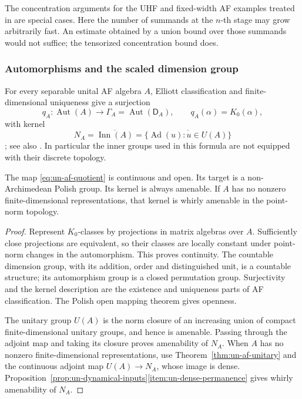 The concentration arguments for the UHF and fixed-width AF examples
treated in \cite[Proposition~5.1]{EFHKKL2016} are special cases.
Here the number of summands at the \(n\)-th stage may grow arbitrarily
fast. An estimate obtained by a union bound over those summands
would not suffice; the tensorized concentration bound does.


\subsubsection{Automorphisms and the scaled dimension group}
For every separable unital AF algebra \(A\), Elliott classification and
finite-dimensional uniqueness give a surjection
\begin{equation}\label{eq:un-af-quotient}
 q_A:\operatorname{Aut}(A)\longrightarrow\Gamma_A=\operatorname{Aut}(\mathsf D_A),\qquad
 q_A(\alpha)=K_0(\alpha),
\end{equation}
with kernel
\[
 N_A=\overline{\operatorname{Inn}(A)}
 =\overline{\{\operatorname{Ad}(u):u\in U(A)\}}
\]
\cite{Elliott1976}; see also \cite[Exercise~7.7.5]{Blackadar1998}. In particular the inner groups used in
this formula are not equipped with their discrete topology.

\begin{proposition}\label{prop:un-af-quotient}
The map \eqref{eq:un-af-quotient} is continuous and open.
Its target is a non-Archimedean Polish group. Its kernel is always
amenable. If \(A\) has no nonzero finite-dimensional representations,
that kernel is whirly amenable in the point-norm topology.
\end{proposition}
\begin{proof}
Represent \(K_0\)-classes by projections in matrix algebras over \(A\).
Sufficiently close projections are equivalent, so their classes are
locally constant under point-norm changes in the automorphism.
This proves continuity.
The countable dimension group, with its addition, order and distinguished unit,
is a countable structure; its automorphism group is a closed
permutation group. Surjectivity and the kernel description are
the existence and uniqueness parts of AF classification. The
Polish open mapping theorem gives openness.

The unitary group \(U(A)\) is the norm closure of an
increasing union of compact finite-dimensional unitary groups,
and hence is amenable. Passing through the adjoint map and taking its
closure proves amenability of \(N_A\). When \(A\) has no nonzero
finite-dimensional representations, use
Theorem~\ref{thm:un-af-unitary} and the continuous adjoint map
\(U(A)\to N_A\), whose image is dense. Proposition~\ref{prop:un-dynamical-inputs}\ref{item:un-dense-permanence}
gives whirly amenability of \(N_A\).
\end{proof}

